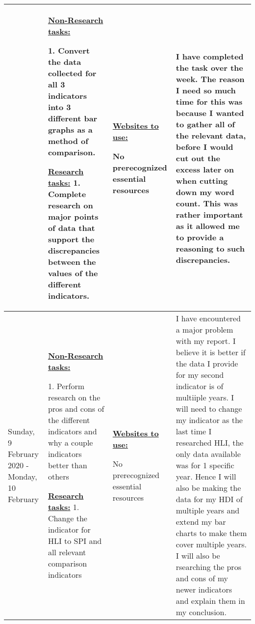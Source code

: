 \documentclass[11pt, a4paper]{article}
\begin{document}
\begin{landscape}
\begin{longtable}{|m{2.5cm}|m{6.6cm}|m{6.6cm}|m{9.41cm}|}
				&
				
				\textbf{\underline{Non-Research tasks:}}
				
				1. Convert the data collected for all 3 indicators into 3 different bar graphs as a method of comparison.
				
				\textbf{\underline{Research tasks:}}
				1. Complete research on major points of data that support the discrepancies between the values of the different indicators.

			  	& 
		 	
				\textbf{\underline{Websites to use:}}
				\newline
			
				No prerecognized essential resources
				
				&
				
				I have completed the task over the week. The reason I need so much time for this was because I wanted to gather all of the relevant data, before I would cut out the excess later on when cutting down my word count. This was rather important as it allowed me to provide a reasoning to such discrepancies.

				\\
				\hline

				
				Sunday, 9 February 2020 - Monday, 10 February

				&
				
				\textbf{\underline{Non-Research tasks:}}
				
				1. Perform research on the pros and cons of the different indicators and why a couple indicators better than others
				
				\textbf{\underline{Research tasks:}}
				1. Change the indicator for HLI to SPI and all relevant comparison indicators

			  	& 
		 	
				\textbf{\underline{Websites to use:}}
				\newline
			
				
				No prerecognized essential resources
				
				&
				
				I have encountered a major problem with my report. I believe it is better if the data I provide for my second indicator is of multiiple years. I will need to change my indicator as the last time I researched HLI, the only data available was for 1 specific year. Hence I will also be making the data for my HDI of multiple years and extend my bar charts to make them cover multiple years. I will also be rsearching the pros and cons of my newer indicators and explain them in my conclusion.


\end{longtable}
\end{landscape}
\end{document}
